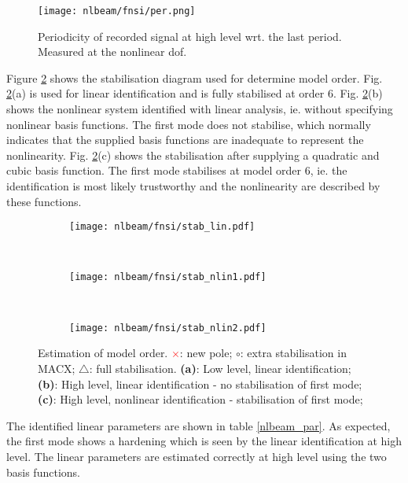 \begin{figure}[!ht]
  \centering
  \texttt{[image: nlbeam/fnsi/per.png]}
  \caption{Periodicity of recorded signal at high level wrt. the last period.
    Measured at the nonlinear dof.}
  \label{fig:nlbeam_per}
\end{figure}

Figure \ref{fig:nlbeam_stab} shows the stabilisation diagram used for determine
model order. Fig. \ref{fig:nlbeam_stab}(a) is used for linear identification and
is fully stabilised at order 6. Fig. \ref{fig:nlbeam_stab}(b) shows the
nonlinear system identified with linear analysis, ie. without specifying
nonlinear basis functions. The first mode does not stabilise, which normally
indicates that the supplied basis functions are inadequate to represent the
nonlinearity. Fig. \ref{fig:nlbeam_stab}(c) shows the stabilisation after
supplying a quadratic and cubic basis function. The first mode stabilises at
model order 6, ie. the identification is most likely trustworthy and the
nonlinearity are described by these functions.

\begin{figure}
  \centering
    \begin{subfigure}[b]{0.45\textwidth}
      \texttt{[image: nlbeam/fnsi/stab\_lin.pdf]}
      \caption{}
    \end{subfigure}
    ~
    \begin{subfigure}[b]{0.45\textwidth}
      \texttt{[image: nlbeam/fnsi/stab\_nlin1.pdf]}
      \caption{}
    \end{subfigure}
    \\
    \begin{subfigure}[b]{0.45\textwidth}
      \texttt{[image: nlbeam/fnsi/stab\_nlin2.pdf]}
      \caption{}
    \end{subfigure}
    \caption{Estimation of model order.
    \textcolor{red}{$\pmb\times$}: new pole;
    $\pmb\circ$: extra stabilisation in MACX;
    $\pmb\triangle$: full stabilisation.
    \textbf{(a)}: Low level, linear identification;
    \textbf{(b)}: High level, linear identification - no stabilisation of first mode;
    \textbf{(c)}: High level, nonlinear identification - stabilisation of first mode;
  }
  \label{fig:nlbeam_stab}
\end{figure}

The identified linear parameters are shown in table \ref{nlbeam_par}. As
expected, the first mode shows a hardening which is seen by the linear
identification at high level. The linear parameters are estimated correctly at
high level using the two basis functions.

